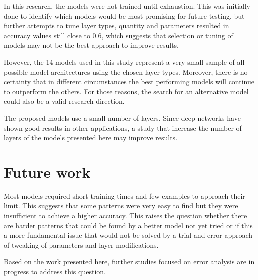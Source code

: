 
In this research, the models were not trained until exhaustion. This was initially done to identify which models would be most promising for future testing, but further attempts to tune layer types, quantity and parameters resulted in accuracy values still close to 0.6, which suggests that selection or tuning of models may not be the best approach to improve results.

However, the 14 models used in this study represent a very small sample of all possible model architectures using the chosen layer types. Moreover, there is no certainty that in different circumstances the best performing models will continue to outperform the others. For those reasons, the search for an alternative model could also be a valid research direction.

The proposed models use a small number of layers. Since deep networks have shown good results in other applications, a study that increase the number of layers of the models presented here may improve results.

\section{Future work}

Most models required short training times and few examples to approach their limit.
This suggests that some patterns were very easy to find but they were insufficient to achieve a higher accuracy.
This raises the question whether there are harder patterns that could be found by a better model not yet tried or if this a more fundamental issue that would not be solved by a trial and error approach of tweaking of parameters and layer modifications.

Based on the work presented here, further studies focused on error analysis are in progress to address this question.